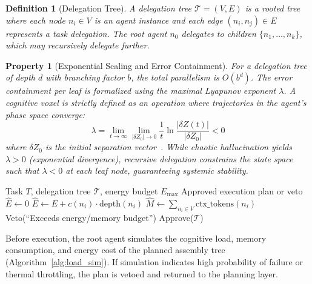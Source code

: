 \documentclass[11pt,a4paper]{article}
\newtheorem{definition}{Definition}
\newtheorem{property}{Property}
\begin{document}
\begin{definition}[Delegation Tree]
A delegation tree $\mathcal{T} = (V, E)$ is a rooted tree where each node $n_i \in V$ is an agent instance and each edge $(n_i, n_j) \in E$ represents a task delegation. The root agent $n_0$ delegates to children $\{n_1, \ldots, n_k\}$, which may recursively delegate further.
\end{definition}

\begin{property}[Exponential Scaling and Error Containment]
For a delegation tree of depth $d$ with branching factor $b$, the total parallelism is $O(b^d)$. The error containment per leaf is formalized using the maximal Lyapunov exponent $\lambda$. A cognitive voxel is strictly defined as an operation where trajectories in the agent's phase space converge:
\begin{equation}
    \lambda = \lim_{t\to\infty} \lim_{|\delta Z_0|\to 0} \frac{1}{t} \ln \frac{|\delta Z(t)|}{|\delta Z_0|} < 0
\end{equation}
where $\delta Z_0$ is the initial separation vector~\citep{benettin1980lyapunov}. While chaotic hallucination yields $\lambda > 0$ (exponential divergence), recursive delegation constrains the state space such that $\lambda < 0$ at each leaf node, guaranteeing systemic stability.
\end{property}

\begin{algorithm}[t]
\caption{Pre-Execution Load Simulation}
\label{alg:load_sim}
\begin{algorithmic}[1]
\Require Task $T$, delegation tree $\mathcal{T}$, energy budget $E_{\max}$
\Ensure Approved execution plan or veto
\State $\hat{E} \gets 0$ 
    \State $\hat{E} \gets \hat{E} + c(n_i) \cdot \text{depth}(n_i)$
\EndFor
\State $\hat{M} \gets \sum_{n_i \in V} \text{ctx\_tokens}(n_i)$ 
    \State \Return \textsf{Veto}(``Exceeds energy/memory budget'')
\Else
    \State \Return \textsf{Approve}($\mathcal{T}$)
\EndIf
\end{algorithmic}
\end{algorithm}

\noindent Before execution, the root agent simulates the cognitive load, memory consumption, and energy cost of the planned assembly tree (Algorithm~\ref{alg:load_sim}). If simulation indicates high probability of failure or thermal throttling, the plan is vetoed and returned to the planning layer.
\end{document}
